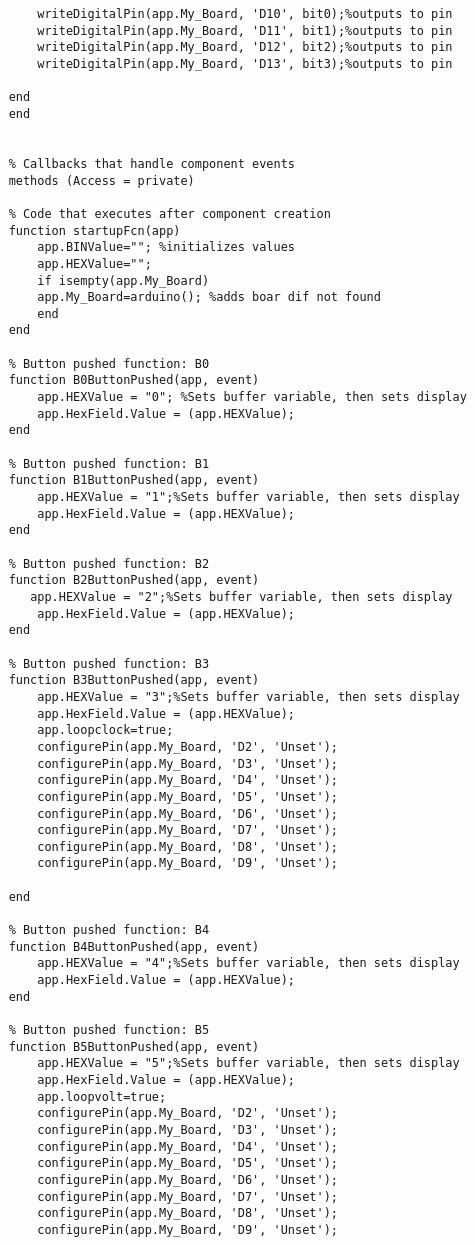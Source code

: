 \documentclass[11pt]{article}
\begin{document}
\begin{verbatim}
	    writeDigitalPin(app.My_Board, 'D10', bit0);%outputs to pin
	    writeDigitalPin(app.My_Board, 'D11', bit1);%outputs to pin
	    writeDigitalPin(app.My_Board, 'D12', bit2);%outputs to pin
	    writeDigitalPin(app.My_Board, 'D13', bit3);%outputs to pin

	end
    end


    % Callbacks that handle component events
    methods (Access = private)

	% Code that executes after component creation
	function startupFcn(app)
	    app.BINValue=""; %initializes values
	    app.HEXValue="";
	    if isempty(app.My_Board)
		app.My_Board=arduino(); %adds boar dif not found
	    end 
	end

	% Button pushed function: B0
	function B0ButtonPushed(app, event)
	    app.HEXValue = "0"; %Sets buffer variable, then sets display
	    app.HexField.Value = (app.HEXValue);
	end

	% Button pushed function: B1
	function B1ButtonPushed(app, event)
	    app.HEXValue = "1";%Sets buffer variable, then sets display
	    app.HexField.Value = (app.HEXValue);
	end

	% Button pushed function: B2
	function B2ButtonPushed(app, event)
	   app.HEXValue = "2";%Sets buffer variable, then sets display
	    app.HexField.Value = (app.HEXValue); 
	end

	% Button pushed function: B3
	function B3ButtonPushed(app, event)
	    app.HEXValue = "3";%Sets buffer variable, then sets display
	    app.HexField.Value = (app.HEXValue);
	    app.loopclock=true;
	    configurePin(app.My_Board, 'D2', 'Unset');
	    configurePin(app.My_Board, 'D3', 'Unset');
	    configurePin(app.My_Board, 'D4', 'Unset');
	    configurePin(app.My_Board, 'D5', 'Unset');
	    configurePin(app.My_Board, 'D6', 'Unset');
	    configurePin(app.My_Board, 'D7', 'Unset');
	    configurePin(app.My_Board, 'D8', 'Unset');
	    configurePin(app.My_Board, 'D9', 'Unset');

	end

	% Button pushed function: B4
	function B4ButtonPushed(app, event)
	    app.HEXValue = "4";%Sets buffer variable, then sets display
	    app.HexField.Value = (app.HEXValue);
	end

	% Button pushed function: B5
	function B5ButtonPushed(app, event)
	    app.HEXValue = "5";%Sets buffer variable, then sets display
	    app.HexField.Value = (app.HEXValue);
	    app.loopvolt=true;
	    configurePin(app.My_Board, 'D2', 'Unset');
	    configurePin(app.My_Board, 'D3', 'Unset');
	    configurePin(app.My_Board, 'D4', 'Unset');
	    configurePin(app.My_Board, 'D5', 'Unset');
	    configurePin(app.My_Board, 'D6', 'Unset');
	    configurePin(app.My_Board, 'D7', 'Unset');
	    configurePin(app.My_Board, 'D8', 'Unset');
	    configurePin(app.My_Board, 'D9', 'Unset');


\end{verbatim}
\end{document}
